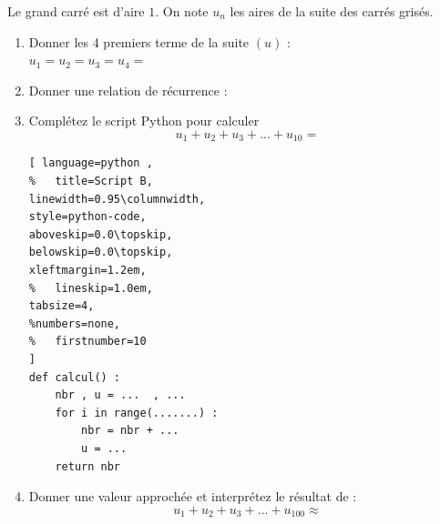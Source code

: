 \documentclass[main.tex]{subfiles}
\begin{document}
\begin{exercise}\label{chapter05:exercise:suites06} Le grand carré est d'aire $1$. On note $u_n$ les aires de la suite des carrés grisés.  
	
	
\noindent
\begin{minipage}{0.62\linewidth} 
\begin{enumerate}[label=\arabic*),leftmargin=*]
	\item Donner les 4 premiers terme de la suite $(u)$ :\\
	$u_1=$\dotfill $u_2=$\dotfill $u_3=$\dotfill $u_4=$\dotfill 
	\item Donner une relation de récurrence :\dotfill 
	\item Complétez le script Python pour calculer 
	\setlength{\abovedisplayskip}{3pt}
	\setlength{\belowdisplayskip}{3pt}
$$u_1+u_2+u_3+\ldots+u_{10}=$$	
\begin{lstlisting}[ language=python , 
%	title=Script B,   
linewidth=0.95\columnwidth,
style=python-code,    
aboveskip=0.0\topskip,
belowskip=0.0\topskip,
xleftmargin=1.2em,
%	lineskip=1.0em,
tabsize=4, 
%numbers=none,
%	firstnumber=10  
] 
def calcul() :
	nbr , u = ...  , ...
	for i in range(.......) :
		nbr = nbr + ...
		u = ...
	return nbr
\end{lstlisting}
	\item Donner une valeur approchée et interprétez le résultat de : 
	\setlength{\abovedisplayskip}{3pt}
	\setlength{\belowdisplayskip}{3pt}
	$$u_1+u_2+u_3+\ldots +u_{100}\approx $$
\end{enumerate}	 
\end{minipage} 
\hfill 
\begin{minipage}{0.35\linewidth} 
\end{minipage}
\end{exercise}
\end{document}
